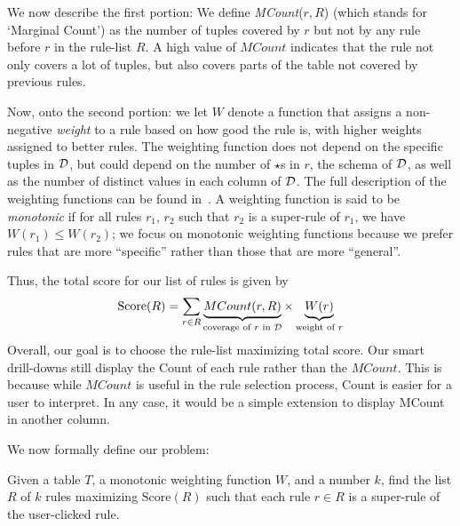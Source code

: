 We now describe the first portion:
We define {\em MCount}($r, R$) (which stands for `Marginal Count') as the number of tuples covered by $r$ but not by any rule before $r$ in the rule-list $R$. A high value of $MCount$ indicates that the rule not only covers a lot of tuples, but also covers parts of the table not covered by previous rules. 

Now, onto the second portion: we let $W$ denote a function that assigns a non-negative {\em weight} to a rule based on how good the rule is, with higher weights assigned to better rules. 
The weighting function does not depend on the specific
tuples in $\mathcal{D}$, but could 
depend on the number of $\star$s in $r$,
the schema of $\mathcal{D}$, 
as well as the number of distinct values in each column of $\mathcal{D}$. The full description of the weighting functions
can be found in~\cite{tr}.
A weighting function is said to be {\em monotonic} if for all rules $r_1$, $r_2$ such that $r_2$ is a super-rule of $r_1$, we have $W(r_1) \leq W(r_2)$; we focus
on monotonic weighting functions because we prefer 
rules that are more ``specific''
rather than those that are more ``general''. 

Thus, the total score for our list of rules is given by 
$$\text{Score}(R) = \sum_{r \in R} \underbrace{MCount(r, R)}_{\text{coverage of $r$ in $\mathcal{D}$}} \times \underbrace{W(r)}_{\text{weight of $r$}}$$ 
Overall, our goal is to choose the rule-list maximizing 
total score. 
Our smart drill-downs still display the Count of each rule rather than the $MCount$. This is because while $MCount$ is useful in the rule selection process, Count is easier for a user to interpret. In any case, it would be a simple extension to display MCount in another column.

 We now formally define our problem:
\begin{problem}\label{prob:optimal-subrule-list}
Given a table $T$, a monotonic weighting function $W$, and a number $k$, find the list $R$ of $k$ rules maximizing $\text{Score}(R)$
such that each rule $r \in R$ is a super-rule of the user-clicked rule.
\end{problem}
